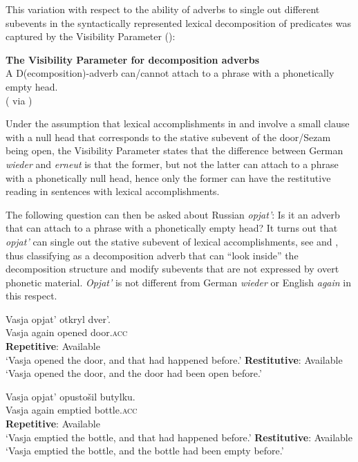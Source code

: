 \documentclass[output=paper]{langscibook}
\begin{document}
\noindent This variation with respect to the ability of adverbs to single out different subevents in the syntactically represented lexical decomposition of predicates was captured by the Visibility Parameter (\citealt{Rapp-vonStechow1999,Beck2005}):


 \ea\label{ex:bondarenko:15}
\textbf{The Visibility Parameter for decomposition adverbs}\\
A D(ecomposition)-adverb can\slash cannot attach to a phrase with a phonetically empty head.\\
\hfill(\citealt{Rapp-vonStechow1999} via \citealt[13]{Beck2005})
\z

\noindent Under the assumption that lexical accomplishments in  and  involve a small clause with a null head that corresponds to the stative subevent of the door\slash Sezam being open, the Visibility Parameter states that the difference between German \textit{wieder} and \textit{erneut} is that the former, but not the latter can attach to a phrase with a phonetically null head, hence only the former can have the restitutive reading in sentences with lexical accomplishments.



The following question can then be asked about Russian \textit{opjat’}: Is it an adverb that can attach to a phrase with a phonetically empty head? It turns out that \textit{opjat’} can single out the stative subevent of lexical accomplishments, see  and , thus classifying as a decomposition adverb that can “look inside” the decomposition structure and modify subevents that are not expressed by overt phonetic material. \textit{Opjat’} is not different from German \textit{wieder} or English \textit{again} in this respect.\largerpage[-1]


 \ea\label{ex:bondarenko:16}
\gll Vasja opjat’ otkryl dver’.\\
     Vasja again opened door.\textsc{acc}\\
\ea \textbf{Repetitive}: Available\\
`Vasja opened the door, and that had happened before.'
\ex \textbf{Restitutive}: Available\\
`Vasja opened the door, and the door had been open before.'
\z
\z

 \ea\label{ex:bondarenko:17}
\gll Vasja opjat’ opustošil butylku.\\
     Vasja again emptied bottle.\textsc{acc}\\
\ea \textbf{Repetitive}: Available\\
`Vasja emptied the bottle, and that had happened before.'
\ex \textbf{Restitutive}: Available\\
`Vasja emptied the bottle, and the bottle had been empty   before.'
\z
\z
\end{document}
